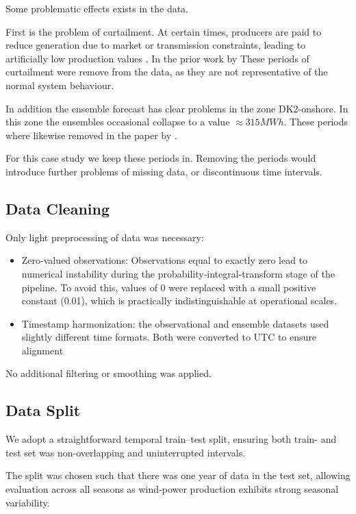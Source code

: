 Some problematic effects exists in the data.

First is the problem of curtailment. At certain times, producers are paid to reduce generation due to market or transmission constraints, leading to artificially low production values \cite{olson2014a}. In the prior work by \citet{jorgensenSequentialMethodsError2025} These periods of curtailment were remove from the data, as they are not representative of the normal system behaviour.

In addition the ensemble forecast has clear problems in the zone DK2-onshore. In this zone the ensembles occasional collapse to a value $\approx  315 MWh$. These periods where likewise removed in the paper by \citet{jorgensenSequentialMethodsError2025}.

For this case study we keep these periods in. Removing the periods would introduce further problems of missing data, or discontinuous time intervals. 

\subsection{Data Cleaning}

Only light preprocessing of data was necessary:

\begin{itemize}
    \item Zero‑valued observations: Observations equal to exactly zero lead to numerical instability during the probability‑integral-transform stage of the pipeline. To avoid this, values of 0 were replaced with a small positive constant (0.01), which is practically indistinguishable at operational scales.
    \item Timestamp harmonization: the observational and ensemble datasets used slightly different time formats. Both were converted to UTC to ensure alignment
\end{itemize} 

No additional filtering or smoothing was applied.

\subsection{Data Split}

We adopt a straightforward temporal train–test split, ensuring both train- and test set was non-overlapping and uninterrupted intervals. \cite[cp. 3]{theodoridis2020a}

The split was chosen such that there was one year of data in the test set, allowing evaluation across all seasons as wind‑power production exhibits strong seasonal variability\cite{wan2012a}.

